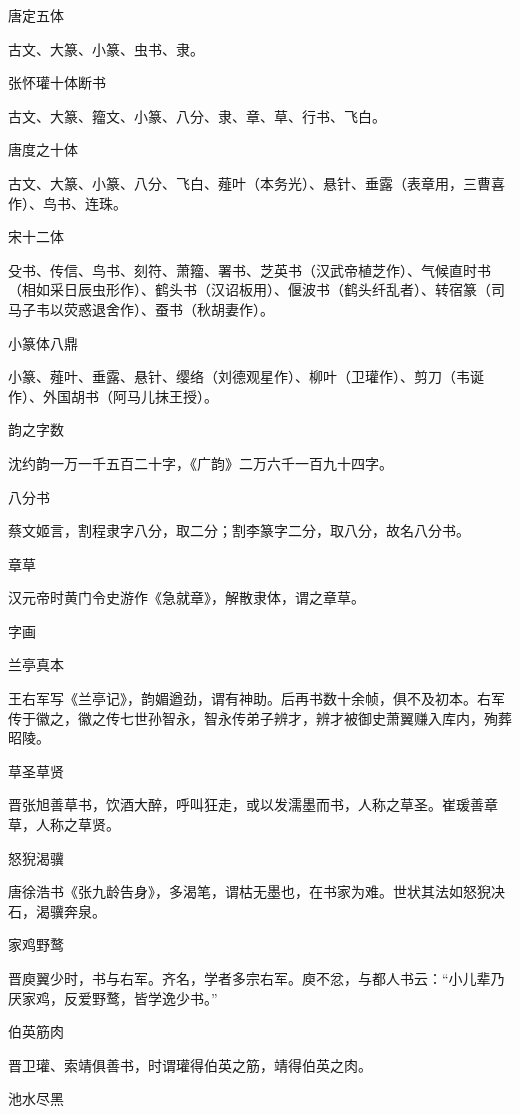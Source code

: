 \documentclass[a4paper,12pt,UTF8,twoside]{ctexbook}
\begin{document}
    唐定五体
    
    古文、大篆、小篆、虫书、隶。
    
    张怀瓘十体断书
    
    古文、大篆、籀文、小篆、八分、隶、章、草、行书、飞白。
    
    唐度之十体
    
    古文、大篆、小篆、八分、飞白、薤叶（本务光）、悬针、垂露（表章用，三曹喜作）、鸟书、连珠。
    
    宋十二体
    
    殳书、传信、鸟书、刻符、萧籀、署书、芝英书（汉武帝植芝作）、气候直时书（相如采日辰虫形作）、鹤头书（汉诏板用）、偃波书（鹤头纤乱者）、转宿篆（司马子韦以荧惑退舍作）、蚕书（秋胡妻作）。
    
    小篆体八鼎
    
    小篆、薤叶、垂露、悬针、缨络（刘德观星作）、柳叶（卫瓘作）、剪刀（韦诞作）、外国胡书（阿马儿抹王授）。
    
    韵之字数
    
    沈约韵一万一千五百二十字，《广韵》二万六千一百九十四字。
    
    八分书
    
    蔡文姬言，割程隶字八分，取二分；割李篆字二分，取八分，故名八分书。
    
    章草
    
    汉元帝时黄门令史游作《急就章》，解散隶体，谓之章草。
    
    字画
    
    兰亭真本
    
    王右军写《兰亭记》，韵媚遒劲，谓有神助。后再书数十余帧，俱不及初本。右军传于徽之，徽之传七世孙智永，智永传弟子辨才，辨才被御史萧翼赚入库内，殉葬昭陵。
    
    草圣草贤
    
    晋张旭善草书，饮酒大醉，呼叫狂走，或以发濡墨而书，人称之草圣。崔瑗善章草，人称之草贤。
    
    怒猊渴骥
    
    唐徐浩书《张九龄告身》，多渴笔，谓枯无墨也，在书家为难。世状其法如怒猊决石，渴骥奔泉。
    
    家鸡野鹜
    
    晋庾翼少时，书与右军。齐名，学者多宗右军。庾不忿，与都人书云：“小儿辈乃厌家鸡，反爱野鹜，皆学逸少书。”
    
    伯英筋肉
    
    晋卫瓘、索靖俱善书，时谓瓘得伯英之筋，靖得伯英之肉。
    
    池水尽黑
    
\end{document}
